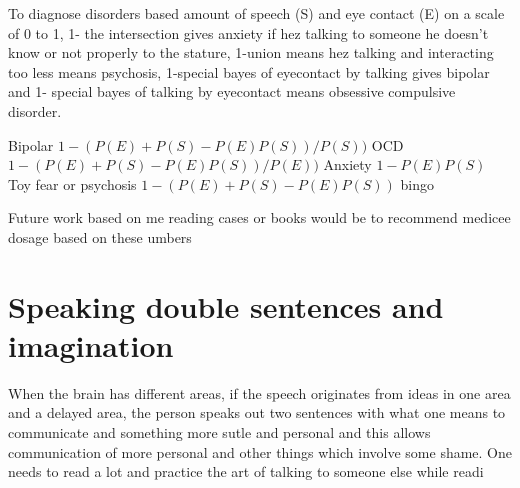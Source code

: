 To diagnose disorders based amount of speech (S) and eye contact (E) on a scale of 0 to 1, 1- the intersection gives anxiety if hez talking to someone he doesn't know or not properly to the stature, 1-union means hez talking and interacting too less means psychosis, 1-special bayes of eyecontact by talking gives bipolar and 1- special bayes of talking by eyecontact means obsessive compulsive disorder.

Bipolar $1-(P(E)+P(S)-P(E)P(S))/P(S))$
OCD $1-(P(E)+P(S)-P(E)P(S))/P(E))$
Anxiety $1-P(E)P(S)$ 
Toy fear or psychosis $1-(P(E)+P(S)-P(E)P(S))$ bingo

Future work based on me reading cases or books would be to recommend medicee dosage based on these umbers

\section{Speaking double sentences and imagination}

When the brain has different areas, if the speech originates from ideas in one area and a delayed area, the person speaks out two sentences with what one means to communicate and something more sutle and personal and this allows communication of more personal and other things which involve some shame. One needs to read a lot and practice the art of talking to someone else while readi


